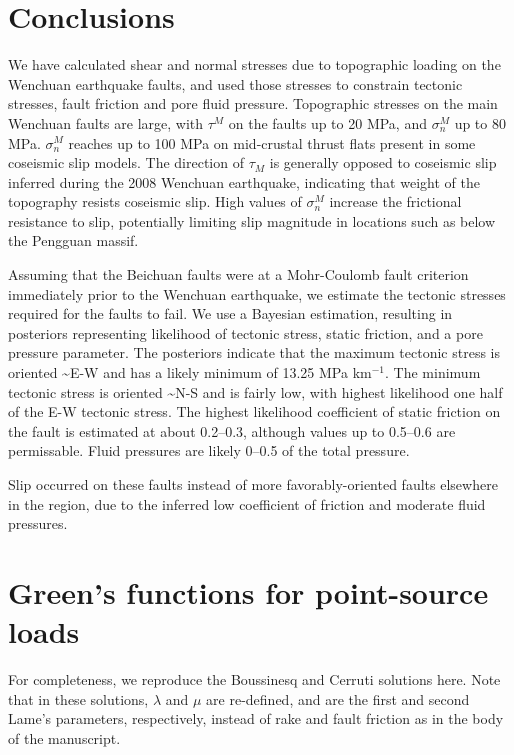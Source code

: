 \documentclass[twocolumn,jgrga]{AGUTeX}
\begin{document}
\begin{article}
{{{\section{Conclusions}\label{conclusions}

We have calculated shear and normal stresses due to topographic loading
on the Wenchuan earthquake faults, and used those stresses to constrain
tectonic stresses, fault friction and pore fluid pressure. Topographic
stresses on the main Wenchuan faults are large, with $\tau^M$ on the
faults up to \textbar{}20\textbar{} MPa, and $\sigma^M_n$ up to 80 MPa.
$\sigma^M_n$ reaches up to 100 MPa on mid-crustal thrust flats present
in some coseismic slip models. The direction of $\tau_M$ is generally
opposed to coseismic slip inferred during the 2008 Wenchuan earthquake,
indicating that weight of the topography resists coseismic slip. High
values of $\sigma^M_n$ increase the frictional resistance to slip,
potentially limiting slip magnitude in locations such as below the
Pengguan massif.

Assuming that the Beichuan faults were at a Mohr-Coulomb fault criterion
immediately prior to the Wenchuan earthquake, we estimate the tectonic
stresses required for the faults to fail. We use a Bayesian estimation,
resulting in posteriors representing likelihood of tectonic stress,
static friction, and a pore pressure parameter. The posteriors
indicate that the maximum tectonic stress is oriented
\textasciitilde{}E-W and has a likely minimum of 13.25 MPa km$^{-1}$.
The minimum tectonic stress is oriented \textasciitilde{}N-S and is
fairly low, with highest likelihood one half of the E-W tectonic stress.
The highest likelihood coefficient of static friction on the fault is
estimated at about 0.2--0.3, although values up to 0.5--0.6 are
permissable. Fluid pressures are likely 0--0.5 of the total pressure.

Slip occurred on these faults instead of more favorably-oriented faults
elsewhere in the region, due to the inferred low coefficient of friction
and moderate fluid pressures.

\appendix

\section{Green's functions for point-source
loads}\label{greens-functions-for-point-source-loads}
For completeness, we reproduce the Boussinesq \citep[e.g.,][]{jeffreys1970}
and Cerruti \citep[e.g.,][]{love1927} solutions here.
Note that in these solutions, $\lambda$ and $\mu$ are re-defined, and
are the first and second Lame's parameters, respectively, instead of
rake and fault friction as in the body of the manuscript.

}}}
\end{article}
\end{document}
